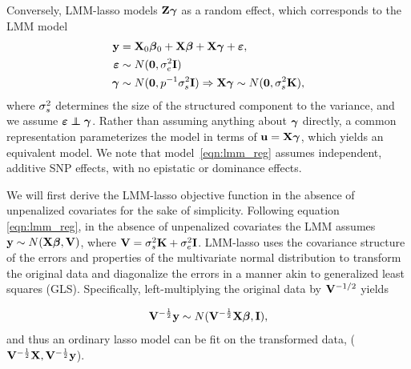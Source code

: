 Conversely, LMM-lasso models $\mathbf{Z}\boldsymbol{\gamma}$ as a random effect, which corresponds to the LMM model
\begin{equation}
  \begin{aligned}
    \label{eqn:lmm_reg}
    \mathbf{y} &= \mathbf{X}_0\boldsymbol{\beta}{}_0 + \mathbf{X}\boldsymbol{\beta}{} + \mathbf{X}\boldsymbol{\gamma}+ \boldsymbol{\varepsilon}{}, \\
    \boldsymbol{\varepsilon}{} &\sim N(\boldsymbol{0}, \sigma^2_e \mathbf{I}) \\
 \boldsymbol{\gamma} &\sim N(\boldsymbol{0}, p^{-1} \sigma^2_s \mathbf{I}) \Rightarrow \mathbf{X} \boldsymbol{\gamma} \sim N(\boldsymbol{0}, \sigma^2_s \mathbf{K}),
  \end{aligned}
\end{equation}
where $\sigma^2_s$ determines the size of the structured component to the variance, and we assume $\beps \independent \bgamma$. Rather than assuming anything about $\boldsymbol{\gamma}$ directly, a common representation parameterizes the model in terms of $\mathbf{u}=\mathbf{X}\boldsymbol{\gamma}$, which yields an equivalent model. We note that model~\eqref{eqn:lmm_reg} assumes independent, additive SNP effects, with no epistatic or dominance effects. 

We will first derive the LMM-lasso objective function in the absence of unpenalized covariates for the sake of simplicity. Following equation \eqref{eqn:lmm_reg}, in the absence of unpenalized covariates the LMM assumes $\mathbf{y} \sim N(\mathbf{X} \boldsymbol{\beta}{}, \mathbf{V})$, where $\mathbf{V} = \sigma^2_s \textbf{K} + \sigma^2_e \textbf{I}$. LMM-lasso uses the covariance structure of the errors and properties of the multivariate normal distribution to transform the original data and diagonalize the errors in a manner akin to generalized least squares (GLS). Specifically, left-multiplying the original data by $\mathbf{V}^{-1/2}$ yields 

\begin{equation}
\label{eqn:rtY_distn}
\mathbf{V}^{-\frac{1}{2}}\mathbf{y} \sim N(\mathbf{V}^{-\frac{1}{2}} \mathbf{X} \boldsymbol{\beta}{}, \mathbf{I}),
\end{equation}
and thus an ordinary lasso model can be fit on the transformed data, ($\mathbf{V}^{-\frac{1}{2}}\mathbf{X}, \mathbf{V}^{-\frac{1}{2}}\mathbf{y}$). 


